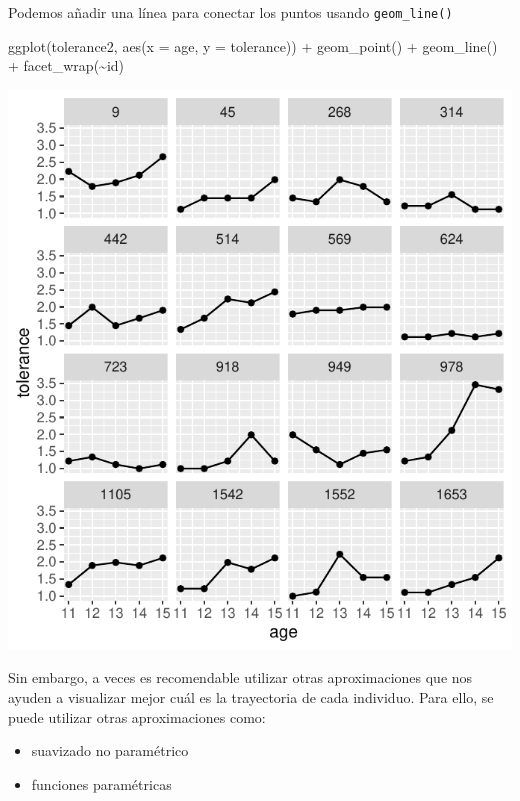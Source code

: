 \documentclass[
]{book}
\newenvironment{Shaded}{\begin{snugshade}}{\end{snugshade}}
\newcommand{\AttributeTok}[1]{\textcolor[rgb]{0.77,0.63,0.00}{#1}}
\newcommand{\FunctionTok}[1]{\textcolor[rgb]{0.00,0.00,0.00}{#1}}
\newcommand{\NormalTok}[1]{#1}
\newcommand{\SpecialCharTok}[1]{\textcolor[rgb]{0.00,0.00,0.00}{#1}}
\providecommand{\tightlist}{%
  \setlength{\itemsep}{0pt}\setlength{\parskip}{0pt}}
\begin{document}
Podemos añadir una línea para conectar los puntos usando \texttt{geom\_line()}

\begin{Shaded}
\begin{Highlighting}[]
\FunctionTok{ggplot}\NormalTok{(tolerance2, }\FunctionTok{aes}\NormalTok{(}\AttributeTok{x =}\NormalTok{ age, }\AttributeTok{y =}\NormalTok{ tolerance)) }\SpecialCharTok{+}
  \FunctionTok{geom\_point}\NormalTok{() }\SpecialCharTok{+}
  \FunctionTok{geom\_line}\NormalTok{() }\SpecialCharTok{+}
  \FunctionTok{facet\_wrap}\NormalTok{(}\SpecialCharTok{\textasciitilde{}}\NormalTok{id)}
\end{Highlighting}
\end{Shaded}

\includegraphics{fig_out/unnamed-chunk-36-1.pdf}

Sin embargo, a veces es recomendable utilizar otras aproximaciones que nos ayuden a visualizar mejor cuál es la trayectoria de cada individuo. Para ello, se puede utilizar otras aproximaciones como:

\begin{itemize}
\tightlist
\item
  suavizado no paramétrico
\item
  funciones paramétricas
\end{itemize}
\end{document}
